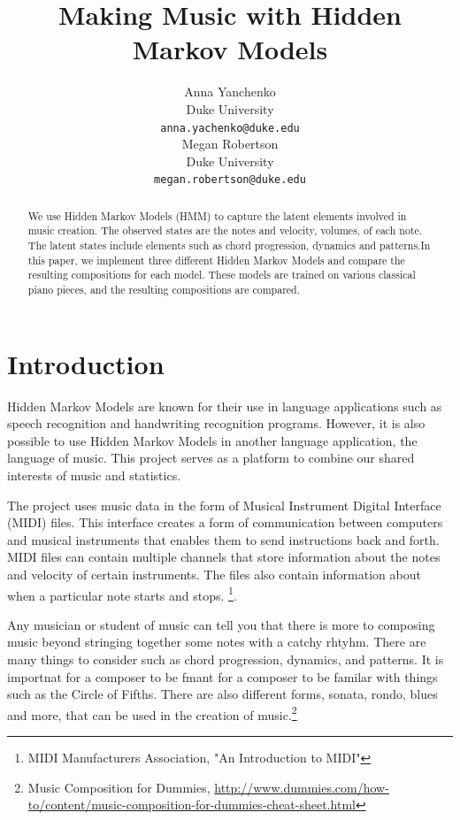 \documentclass{article} %
\title{Making Music with Hidden Markov Models}
\author{
Anna Yanchenko \\
Duke University\\
\texttt{anna.yachenko@duke.edu} \\
\And
Megan Robertson \\
Duke University \\
\texttt{megan.robertson@duke.edu} \\
}
\begin{document}
\maketitle

\begin{abstract}
We use Hidden Markov Models (HMM) to capture the latent elements involved in music creation. The observed states are the notes and velocity, volumes, of each note. The latent states include elements such as chord progression, dynamics and patterns.In this paper, we implement three different Hidden Markov Models and compare the resulting compositions for each model. These models are trained on various classical piano pieces, and the resulting compositions are compared.
\end{abstract}
 
\section{Introduction}

Hidden Markov Models are known for their use in language applications such as speech recognition and handwriting recognition programs. However, it is also possible to use Hidden Markov Models in another language application, the language of music. This project serves as a platform to combine our shared interests of music and statistics. 

The project uses music data in the form of  Musical Instrument Digital Interface (MIDI) files. This interface creates a form of communication between computers and musical instruments that enables them to send instructions back and forth. MIDI files can contain multiple channels that store information about the notes and velocity of certain instruments. The files also contain information about when a particular note starts and stops. \footnote{MIDI Manufacturers Association, "An Introduction to MIDI"}. 

Any musician or student of music can tell you that there is more to composing music beyond stringing together some notes with a catchy rhtyhm. There are many things to consider such as chord progression, dynamics, and patterns. It is importnat for a composer to be fmant for a composer to be familar with things such as the Circle of Fifths. There are also different forms, sonata, rondo, blues and more, that can be used in the creation of music.\footnote{Music Composition for Dummies, \url{http://www.dummies.com/how-to/content/music-composition-for-dummies-cheat-sheet.html}}
\end{document}
